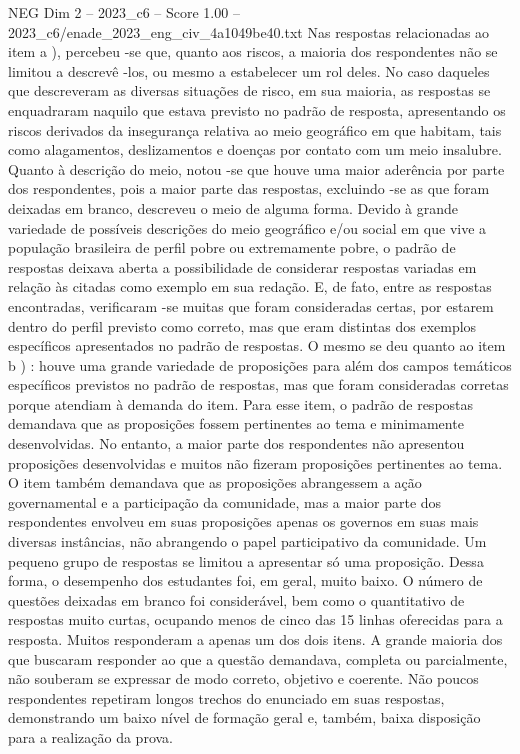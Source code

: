 \begin{textsample}{NEG Dim 2 – 2023\_c6 – Score 1.00 – 2023\_c6/enade\_2023\_eng\_civ\_4a1049be40.txt}
Nas respostas relacionadas ao item a ), percebeu -se que, quanto aos riscos, a maioria dos respondentes não se limitou a descrevê -los, ou mesmo a estabelecer um rol deles.
No caso daqueles que descreveram as diversas situações de risco, em sua maioria, as respostas se enquadraram naquilo que estava previsto no padrão de resposta, apresentando os riscos derivados da insegurança relativa ao meio geográfico em que habitam, tais como alagamentos, deslizamentos e doenças por contato com um meio insalubre.
Quanto à descrição do meio, notou -se que houve uma maior aderência por parte dos respondentes, pois a maior parte das respostas, excluindo -se as que foram deixadas em branco, descreveu o meio de alguma forma.
Devido à grande variedade de possíveis descrições do meio geográfico e/ou social em que vive a população brasileira de perfil pobre ou extremamente pobre, o padrão de respostas deixava aberta a possibilidade de considerar respostas variadas em relação às citadas como exemplo em sua redação.
E, de fato, entre as respostas encontradas, verificaram -se muitas que foram consideradas certas, por estarem dentro do perfil previsto como correto, mas que eram distintas dos exemplos específicos apresentados no padrão de respostas.
O mesmo se deu quanto ao item b ) : houve uma grande variedade de proposições para além dos campos temáticos específicos previstos no padrão de respostas, mas que foram consideradas corretas porque atendiam à demanda do item.
Para esse item, o padrão de respostas demandava que as proposições fossem pertinentes ao tema e minimamente desenvolvidas.
No entanto, a maior parte dos respondentes não apresentou proposições desenvolvidas e muitos não fizeram proposições pertinentes ao tema.
O item também demandava que as proposições abrangessem a ação governamental e a participação da comunidade, mas a maior parte dos respondentes envolveu em suas proposições apenas os governos em suas mais diversas instâncias, não abrangendo o papel participativo da comunidade.
Um pequeno grupo de respostas se limitou a apresentar só uma proposição.
Dessa forma, o desempenho dos estudantes foi, em geral, muito baixo.
O número de questões deixadas em branco foi considerável, bem como o quantitativo de respostas muito curtas, ocupando menos de cinco das 15 linhas oferecidas para a resposta.
Muitos responderam a apenas um dos dois itens.
A grande maioria dos que buscaram responder ao que a questão demandava, completa ou parcialmente, não souberam se expressar de modo correto, objetivo e coerente.
Não poucos respondentes repetiram longos trechos do enunciado em suas respostas, demonstrando um baixo nível de formação geral e, também, baixa disposição para a realização da prova.

\end{textsample}
